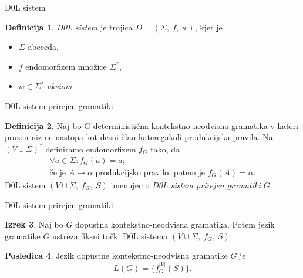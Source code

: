 \documentclass{beamer}
\theoremstyle{definition} %
\newtheorem{definicija}{Definicija}[section]
\newtheorem{izrek}[definicija]{Izrek}
\newtheorem{posledica}[definicija]{Posledica}
\begin{document}
\begin{frame}{D0L sistem}
    \begin{definicija}
        \textit{D0L sistem} je trojica $ D = (\Sigma, \ f, \ w) $, kjer je
        \begin{itemize}
            \item<2-> $ \Sigma $ abeceda,
            \item<3-> $ f $ endomorfizem množice $ \Sigma^* $,
            \item<4-> $ w \in \Sigma^* $ \textit{aksiom}.
        \end{itemize}
        \pause

    \end{definicija}
\end{frame}

\begin{frame}{D0L sistem prirejen gramatiki}
    \begin{definicija}
        Naj bo G deterministična kontekstno-neodvisna gramatika v kateri prazen niz ne nastopa kot desni član kateregakoli
        produkcijska pravila. Na $ (V \cup \Sigma)^* $ definiramo endomorfizem $ f_G $ tako, da 
        \begin{gather*}
            \forall a \in \Sigma \colon f_G(a) = a; \\
            \text{če je } A \rightarrow \alpha \text{ produkcijsko pravilo, potem je } f_G(A) = \alpha.
        \end{gather*}
        \pause
        D0L sistem $ (V \cup \Sigma, \ f_G, \ S) $ imenujemo \textit{D0L sistem prirejen gramatiki $G$}.
    \end{definicija}
\end{frame}

\begin{frame}{D0L sistem prirejen gramatiki}
    \begin{izrek}
        Naj bo $G$ dopustna kontekstno-neodvisna gramatika.
        Potem jezik gramatike $G$ ustreza fiksni točki D0L sistema $ (V \cup \Sigma, \ f_G, \ S) $.
    \end{izrek}
    \pause
    \begin{posledica}
        Jezik dopustne kontekstno-neodvisna gramatike $G$ je
        \[
            L(G) = \{f_G^{|V|}(S) \}.
        \]
    \end{posledica}
\end{frame}
\end{document}
